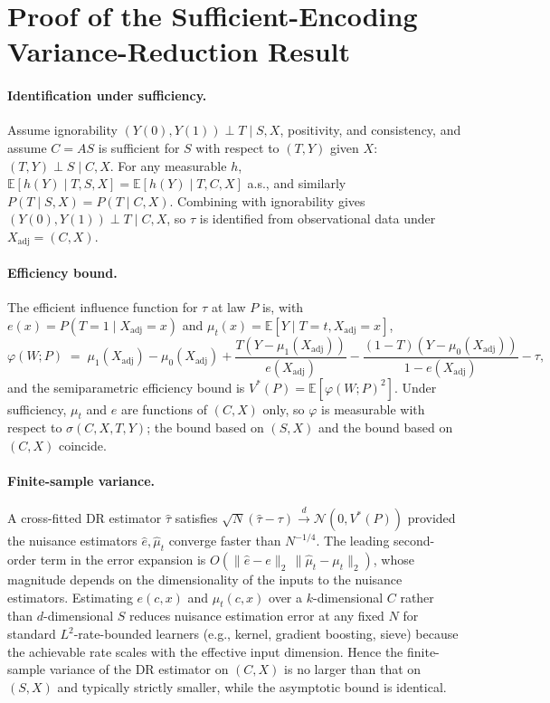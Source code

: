 \documentclass{article}
\begin{document}
\section{Proof of the Sufficient-Encoding Variance-Reduction Result}
\label{app:proof}
\paragraph{Identification under sufficiency.}
Assume ignorability $(Y(0),Y(1))\perp T\mid S,X$, positivity, and consistency,
and assume $C=AS$ is sufficient for $S$ with respect to $(T,Y)$ given $X$:
$(T,Y)\perp S\mid C,X$. For any measurable $h$,
$\mathbb{E}[h(Y)\mid T,S,X]=\mathbb{E}[h(Y)\mid T,C,X]$ a.s., and similarly
$P(T\mid S,X)=P(T\mid C,X)$. Combining with ignorability gives
$(Y(0),Y(1))\perp T\mid C,X$, so $\tau$ is identified from observational data
under $X_{\text{adj}}=(C,X)$.

\paragraph{Efficiency bound.}
The efficient influence function for $\tau$ at law $P$ is, with
$e(x)=P(T{=}1\mid X_{\text{adj}}{=}x)$ and $\mu_t(x)=\mathbb{E}[Y\mid T{=}t,X_{\text{adj}}{=}x]$,
\[
\varphi(W;P)\;=\;\mu_1(X_{\text{adj}})-\mu_0(X_{\text{adj}})
+\frac{T(Y-\mu_1(X_{\text{adj}}))}{e(X_{\text{adj}})}
-\frac{(1-T)(Y-\mu_0(X_{\text{adj}}))}{1-e(X_{\text{adj}})}-\tau,
\]
and the semiparametric efficiency bound is $V^*(P)=\mathbb{E}[\varphi(W;P)^2]$.
Under sufficiency, $\mu_t$ and $e$ are functions of $(C,X)$ only, so
$\varphi$ is measurable with respect to $\sigma(C,X,T,Y)$; the bound based on
$(S,X)$ and the bound based on $(C,X)$ coincide.\cite{hahn1998role}

\paragraph{Finite-sample variance.}
A cross-fitted DR estimator $\hat\tau$ satisfies
$\sqrt{N}(\hat\tau-\tau)\overset{d}{\to}\mathcal{N}(0,V^*(P))$ provided the
nuisance estimators $\hat e,\hat\mu_t$ converge faster than
$N^{-1/4}$.\cite{chernozhukov2018double} The leading second-order term in the
error expansion is $O(\|\hat e-e\|_2\,\|\hat\mu_t-\mu_t\|_2)$, whose magnitude
depends on the dimensionality of the inputs to the nuisance estimators.
Estimating $e(c,x)$ and $\mu_t(c,x)$ over a $k$-dimensional $C$ rather than
$d$-dimensional $S$ reduces nuisance estimation error at any fixed $N$ for
standard $L^2$-rate-bounded learners (e.g., kernel, gradient boosting, sieve)
because the achievable rate scales with the effective input
dimension.\cite{ma2012semiparametric,nabi2022causal} Hence the finite-sample
variance of the DR estimator on $(C,X)$ is no larger than that on $(S,X)$ and
typically strictly smaller, while the asymptotic bound is identical.
\end{document}

